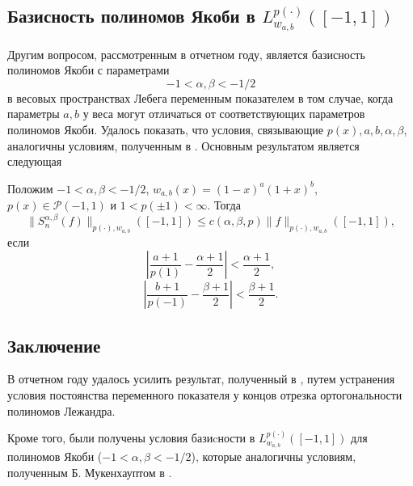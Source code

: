 \subsection{Базисность полиномов Якоби в $L^{p(\cdot)}_{w_{a,b}}([-1,1])$}
Другим вопросом, рассмотренным в отчетном году, является базисность полиномов Якоби с параметрами
$$-1<\alpha,\beta<-1/2$$
в весовых пространствах Лебега переменным показателем в том случае, когда параметры $a,b$ у веса могут отличаться от соответствующих параметров полиномов Якоби. Удалось показать, что условия, связывающие $p(x),a,b,\alpha,\beta$, аналогичны условиям, полученным в \cite{tad-Muckenhoupt}.
Основным результатом является следующая
\begin{theorem}\label{tad-Th1}
  Положим $-1<\alpha,\beta<-1/2$, $w_{a,b}(x)=(1-x)^a(1+x)^b$, $p(x)\in\mathcal{P}(-1,1)$ и $1<p(\pm1)<\infty$. Тогда
$$
\|S_n^{\alpha,\beta}(f)\|_{p(\cdot),w_{a,b}}([-1,1])\le c(\alpha,\beta,p)\|f\|_{p(\cdot),w_{a,b}}([-1,1]),
$$
если
$$
\left|\frac{a+1}{p(1)}-\frac{\alpha+1}2\right|<\frac{\alpha+1}2,
$$
$$
\left|\frac{b+1}{p(-1)}-\frac{\beta+1}2\right|<\frac{\beta+1}2.
$$
\end{theorem}
\subsection{Заключение}
В отчетном году удалось усилить результат, полученный в \cite{tad-SHII-Leg}, путем устранения условия постоянства переменного показателя у концов отрезка ортогональности полиномов Лежандра.

Кроме того, были получены условия базиcности в $L^{p(\cdot)}_{w_{a,b}}([-1,1])$ для полиномов Якоби ($-1<\alpha,\beta<-1/2$), которые аналогичны условиям, полученным Б. Мукенхауптом в \cite{tad-Muckenhoupt}.



